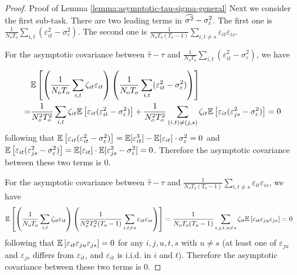 \begin{proof}{Proof of Lemma \ref{lemma:asymptotic-tau-sigma-general}}
Next we consider the first sub-task. There are two leading terms in $\widehat{\sigma^2} - \sigma^2_\varepsilon$. The first one is $\frac{1}{N_o T_o} \sum_{i,t} (\varepsilon_{it}^2 - \sigma_\varepsilon^2 )$. The second one is $ \frac{1}{N_o T_o(T_o-1)} \sum_{i, t\neq s} \varepsilon_{it} \varepsilon_{is}$. 

For the asymptotic covariance between $\hat{\tau} - \tau$ and $\frac{1}{N_o T_o} \sum_{i,t} (\varepsilon_{it}^2 - \sigma_\varepsilon^2 )$, we have 

\begin{align*}
     & \mathbb{E}\left[\left( \frac{1}{N_o T_o} \sum_{i,t} \zeta_{it} \varepsilon_{it} \right) \left(  \frac{1}{N_o T_o} \sum_{i,t} (\varepsilon_{it}^2 - \sigma_\varepsilon^2 ) \right) \right] \\
    =& \frac{1}{N^2_o T^2_o} \sum_{i,t} \zeta_{it} \mathbb{E}\left[\varepsilon_{it} (\varepsilon_{it}^2 - \sigma_\varepsilon^2) \right] + \frac{1}{N^2_o T^2_o} \sum_{(i,t) \neq (j,s)}  \zeta_{it} \mathbb{E}\left[ \varepsilon_{it} (\varepsilon_{js}^2 - \sigma_\varepsilon^2) \right] 
    = 0
\end{align*}
following that $\mathbb{E}\left[\varepsilon_{it} (\varepsilon_{it}^2 - \sigma_\varepsilon^2) \right] = \mathbb{E}[\varepsilon_{it}^3] - \mathbb{E}[\varepsilon_{it}] \cdot\sigma_\varepsilon^2 = 0$ and $\mathbb{E}\left[\varepsilon_{it} (\varepsilon_{js}^2 - \sigma_\varepsilon^2) \right] = \mathbb{E}[\varepsilon_{it}] \cdot \mathbb{E}[\varepsilon_{js}^2 - \sigma_\varepsilon^2] = 0$. Therefore the asymptotic covariance between these two terms is $0$. 

For the asymptotic covariance between $\hat{\tau} - \tau$ and $\frac{1}{N_o T_o (T_o-1)} \sum_{i, t\neq s} \varepsilon_{it} \varepsilon_{is} $, we have
\begin{align*}
        & \mathbb{E}\left[\left( \frac{1}{N_o T_o} \sum_{i,t} \zeta_{it} \varepsilon_{it} \right) \left( \frac{1}{N^2_o T^2_o (T_o-1)} \sum_{i, t\neq s} \varepsilon_{it} \varepsilon_{is}  \right) \right]
    = \frac{1}{N_o T_o (T_o-1)} \sum_{i,j, t, u \neq s} \zeta_{it} 
\mathbb{E} \left[\varepsilon_{it} \varepsilon_{ju} \varepsilon_{js} \right]= 0
\end{align*}
following that $\mathbb{E} \left[\varepsilon_{it} \varepsilon_{ju} \varepsilon_{js} \right] = 0$ for any $i, j, u, t, s$ with $u \neq s$ (at least one of $\varepsilon_{ju} $ and $\varepsilon_{js}$ differs from $\varepsilon_{it}$, and $\varepsilon_{it}$ is i.i.d. in $i$ and $t$). Therefore the asymptotic covariance between these two terms is $0$. 


\end{proof}
